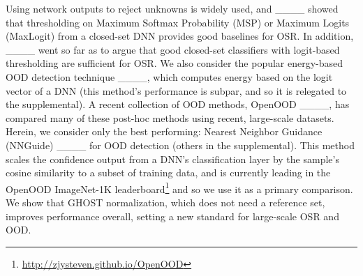 Using network outputs to reject unknowns is widely used, and ____ showed that thresholding on Maximum  Softmax Probability (MSP) or Maximum Logits (MaxLogit) from a closed-set DNN provides good baselines for OSR. 
In addition, ____ went so far as to argue that good closed-set classifiers with logit-based thresholding are sufficient for OSR. 
We also consider the popular energy-based OOD detection technique ____, which computes energy based on the logit vector of a DNN (this method's performance is subpar, and so it is relegated to the supplemental). 
A recent collection of OOD methods, OpenOOD ____, has compared many of these post-hoc methods using recent, large-scale datasets.
Herein, we consider only the best performing: Nearest Neighbor Guidance (NNGuide) ____ for OOD detection (others in the supplemental).
This method scales the confidence output from a DNN's classification layer by the sample's cosine similarity to a subset of training data, and is currently leading in the OpenOOD ImageNet-1K leaderboard\footnote{\url{http://zjysteven.github.io/OpenOOD}} and so we use it as a primary comparison.
We show that GHOST normalization, which does not need a reference set, improves performance overall, setting a new standard for large-scale OSR and OOD.